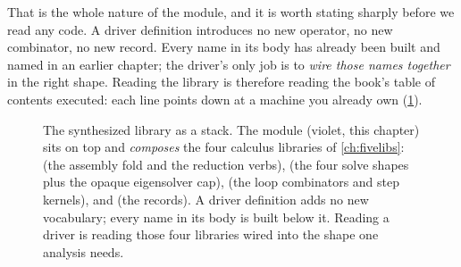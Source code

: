\noindent That is the whole nature of the module, and it is worth stating sharply
before we read any code. A driver definition introduces no new operator, no new
combinator, no new record. Every name in its body has already been built and named
in an earlier chapter; the driver's only job is to \emph{wire those names together}
in the right shape. Reading the  library is therefore reading the
book's table of contents executed: each line points down at a machine you already
own (\cref{fig:lib-stack}).

\begin{figure}[t]
\centering
{}
\caption[The library stack]{The synthesized library as a stack. The
 module (violet, this chapter) sits on top and \emph{composes} the
four calculus libraries of \cref{ch:fivelibs}:  (the assembly
fold and the reduction verbs),  (the four solve shapes plus the
opaque eigensolver cap),  (the loop combinators and step kernels),
and  (the records). A driver definition adds no new vocabulary; every
name in its body is built below it. Reading a driver is reading those four
libraries wired into the shape one analysis needs.}
\label{fig:lib-stack}
\end{figure}


